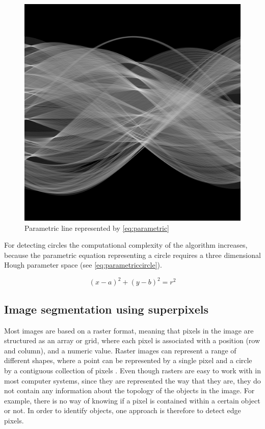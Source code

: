 \begin{figure}[!h]
	\centering
	\includegraphics[scale=0.2]{fig/hough_transform.png}
	\caption{Parametric line represented by \autoref{eq:parametric} \citep{Fisher2003}}
	\label{fig:parametricline}
\end{figure}

For detecting circles the computational complexity of the algorithm increases, because the parametric equation representing a circle requires a three dimensional Hough parameter space (see \autoref{eq:parametriccircle}).

\begin{equation}
	(x-a)^{2}+(y-b)^{2} = r^{2}
	\label{eq:parametriccircle}
\end{equation}

\subsection{Image segmentation using superpixels}
Most images are based on a raster format, meaning that pixels in the image are structured as an array or grid, where each pixel is associated with a position (row and column), and a numeric value. Raster images can represent a range of different shapes, where a point can be represented by a single pixel and a circle by a contiguous collection of pixels \citep{Worboys2003}. Even though rasters are easy to work with in most computer systems, since they are represented the way that they are, they do not contain any information about the topology of the objects in the image. For example, there is no way of knowing if a pixel is contained within a certain object or not. In order to identify objects, one approach is therefore to detect edge pixels.

